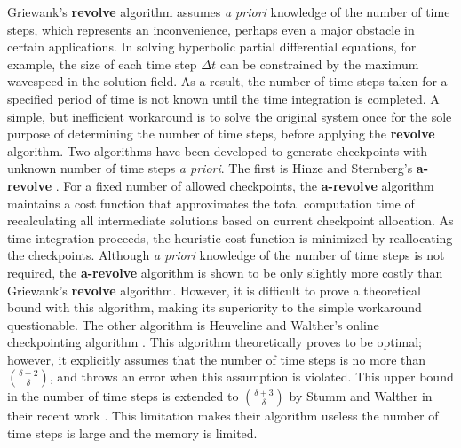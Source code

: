 Griewank's {\bf revolve} algorithm assumes {\it a priori}
knowledge of the number of
time steps,  which represents an inconvenience, perhaps even a major obstacle
in certain applications.  In solving hyperbolic partial differential equations,
for example, the size of each time step $\Delta t$ can be constrained by the
maximum wavespeed in the solution field.  As a result, the number of time
steps taken for a specified
period of time is not known until the time integration is completed.  A simple,
but inefficient workaround is to solve the original system once for the sole
purpose of determining the number of time steps, before applying the
{\bf revolve} algorithm.  Two algorithms have been developed
to generate checkpoints with unknown number of time steps {\it a priori}.
The first is Hinze and Sternberg's {\bf a-revolve} \cite[]{hinze2005}.
For a fixed number of allowed checkpoints, the {\bf a-revolve} algorithm
maintains a cost function that approximates the total computation time of
recalculating all intermediate solutions based on current checkpoint
allocation.  As time
integration proceeds, the heuristic cost function is minimized by reallocating
the checkpoints.  Although {\it a priori}
knowledge of the number of time steps is not
required, the {\bf a-revolve} algorithm is shown to be only slightly more
costly than Griewank's {\bf revolve} algorithm.  However, it is difficult to
prove a theoretical bound with this algorithm, making its superiority to the
simple workaround questionable.  The other algorithm is Heuveline and Walther's
online checkpointing algorithm \cite[]{heuveline2006}.  This algorithm
theoretically proves to be optimal; however, it explicitly assumes that the
number of time steps is no more than $\binom{\delta + 2}{\delta}$, and throws
an error when this assumption is violated.  This upper bound in the number
of time steps is extended to $\binom{\delta + 3}{\delta}$ by Stumm and Walther
in their recent work \cite[]{andrea08}.
This limitation makes their algorithm useless the number of time steps is
large and the memory is limited.

